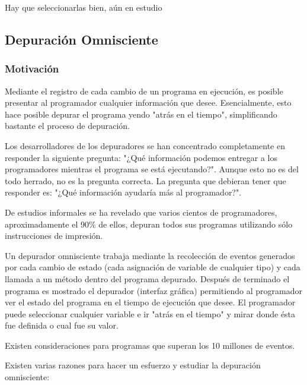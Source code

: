 \documentclass[12pt,a4paper]{report}
\begin{document}
Hay que seleccionarlas bien, aún en estudio

		\subsection{Depuración Omnisciente}
			\subsubsection{Motivación}

Mediante el registro de cada cambio de un programa en ejecución, es posible presentar al programador cualquier información que desee.  Esencialmente, esto hace posible depurar el programa yendo "atrás en el tiempo", simplificando bastante el proceso de depuración.


Los desarrolladores de los depuradores se han concentrado completamente en responder la siguiente pregunta: "¿Qué información podemos entregar a los programadores mientras el programa se está ejecutando?".  Aunque esto no es del todo herrado, no es la pregunta correcta.  La pregunta que debieran tener que responder es: "¿Qué información ayudaría más al programador?".

De estudios informales se ha revelado que varios cientos de programadores, aproximadamente el 90\% de ellos, depuran todos sus programas utilizando sólo instrucciones de impresión.



Un depurador omnisciente trabaja mediante la recolección de eventos generados por cada cambio de estado (cada asignación de variable de cualquier tipo) y cada llamada a un método dentro del programa depurado.  Después de terminado el programa es mostrado el depurador (interfaz gráfica) permitiendo al programador ver el estado del programa en el tiempo de ejecución que desee.  El programador puede seleccionar cualquier variable e ir "atrás en el tiempo" y mirar donde ésta fue definida o cual fue su valor.

Existen consideraciones para programas que superan los 10 millones de eventos.



Existen varias razones para hacer un esfuerzo y estudiar la depuración omnisciente:
\end{document}
